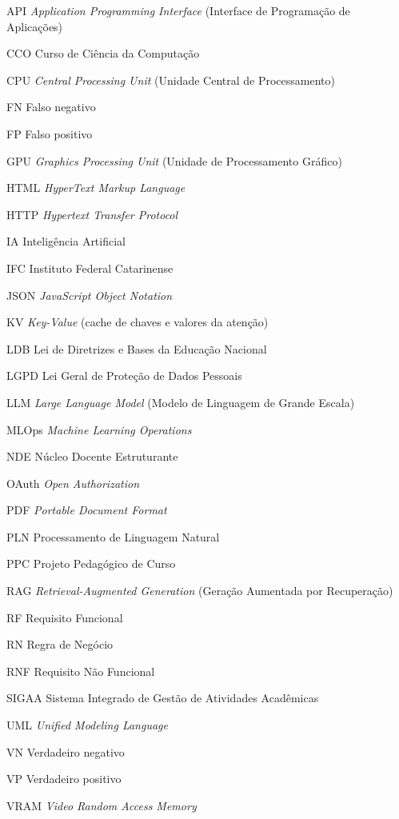\documentclass[
	12pt,				%
	oneside,          %
	a4paper,			%
	chapter=TITLE,		%
	section=TITLE,		%
	subsection=TITLE,	%
	english,			%
	brazil			%
	,sumario=tradicional,
	]{abntex2-IFC}
\begin{document}
\begin{siglas}
  \item[API] \textit{Application Programming Interface} (Interface de Programação de Aplicações)
  \item[CCO] Curso de Ciência da Computação
  \item[CPU] \textit{Central Processing Unit} (Unidade Central de Processamento)
  \item[FN] Falso negativo
  \item[FP] Falso positivo
  \item[GPU] \textit{Graphics Processing Unit} (Unidade de Processamento Gráfico)
  \item[HTML] \textit{HyperText Markup Language}
  \item[HTTP] \textit{Hypertext Transfer Protocol}
  \item[IA] Inteligência Artificial
  \item[IFC] Instituto Federal Catarinense
  \item[JSON] \textit{JavaScript Object Notation}
  \item[KV] \textit{Key-Value} (cache de chaves e valores da atenção)
  \item[LDB] Lei de Diretrizes e Bases da Educação Nacional
  \item[LGPD] Lei Geral de Proteção de Dados Pessoais
  \item[LLM] \textit{Large Language Model} (Modelo de Linguagem de Grande Escala)
  \item[MLOps] \textit{Machine Learning Operations}
  \item[NDE] Núcleo Docente Estruturante
  \item[OAuth] \textit{Open Authorization}
  \item[PDF] \textit{Portable Document Format}
  \item[PLN] Processamento de Linguagem Natural
  \item[PPC] Projeto Pedagógico de Curso
  \item[RAG] \textit{Retrieval-Augmented Generation} (Geração Aumentada por Recuperação)
  \item[RF] Requisito Funcional
  \item[RN] Regra de Negócio
  \item[RNF] Requisito Não Funcional
  \item[SIGAA] Sistema Integrado de Gestão de Atividades Acadêmicas
  \item[UML] \textit{Unified Modeling Language}
  \item[VN] Verdadeiro negativo
  \item[VP] Verdadeiro positivo
  \item[VRAM] \textit{Video Random Access Memory}
\end{siglas}
\end{document}
